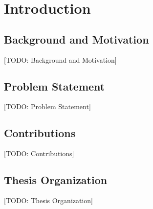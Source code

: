 \chapter{Introduction}
\section{Background and Motivation}
[TODO: Background and Motivation]

\section{Problem Statement}
[TODO: Problem Statement]

\section{Contributions}
[TODO: Contributions]

\section{Thesis Organization}
[TODO: Thesis Organization]
